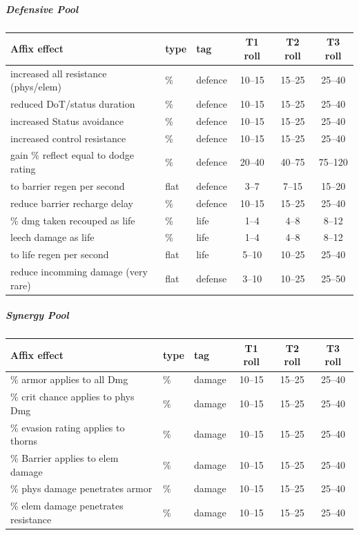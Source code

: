 \subparagraph{Defensive Pool}
\begin{center}
	\begin{tabular}{|l|l|l|c c c|}
		\hline
		\textbf{Affix effect} & \textbf{type} & \textbf{tag} & \textbf{T1 roll} & \textbf{T2 roll} & \textbf{T3 roll} \\
		\hline
		increased all resistance (phys/elem)  & \%   & defence   & 10--15 & 15--25  & 25--40  \\
		reduced DoT/status duration           & \%   & defence   & 10--15 & 15--25  & 25--40  \\
		increased Status avoidance            & \%   & defence   & 10--15 & 15--25  & 25--40  \\
		increased control resistance          & \%   & defence   & 10--15 & 15--25  & 25--40  \\
		gain \% reflect equal to dodge rating & \%   & defence   & 20--40 & 40--75  & 75--120 \\
		to barrier regen per second           & flat & defence   & 3--7   & 7--15   & 15--20  \\
		reduce barrier recharge delay         & \%   & defence   & 10--15 & 15--25  & 25--40  \\
		\hline
		\% dmg taken recouped as life         & \%   & life      & 1--4   & 4--8    & 8--12   \\
		leech damage as life                  & \%   & life      & 1--4   & 4--8    & 8--12   \\
		to life regen per second              & flat & life      & 5--10  & 10--25  & 25--40  \\
		reduce incomming damage	 (very rare)  & flat & defense   & 3--10  &	10--25  & 25--50  \\%
		\hline
	\end{tabular}
\end{center}

\subparagraph{Synergy Pool}
\begin{center}
	\begin{tabular}{|l|l|l|c c c|}
		\hline
		\textbf{Affix effect} & \textbf{type} & \textbf{tag} & \textbf{T1 roll} & \textbf{T2 roll} & \textbf{T3 roll} \\
		\hline
		\% armor applies to all Dmg           & \%   & damage    & 10--15 & 15--25  & 25--40  \\
		\% crit chance applies to phys Dmg    & \%   & damage    & 10--15 & 15--25  & 25--40  \\
		\% evasion rating applies to thorns     & \%   & damage    & 10--15 & 15--25  & 25--40  \\
		\% Barrier applies to elem damage     & \%   & damage    & 10--15 & 15--25  & 25--40  \\
		\% phys damage penetrates armor       & \%   & damage    & 10--15 & 15--25  & 25--40  \\
		\% elem damage penetrates resistance  & \%   & damage    & 10--15 & 15--25  & 25--40  \\
		\hline
	\end{tabular}
\end{center}

